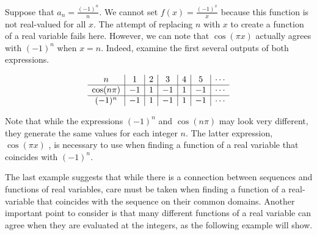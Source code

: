 \documentclass{ximera}
\begin{document}
\begin{example}
Suppose that $a_n = \frac{(-1)^n}{n}$.  We cannot set $f(x) = \frac{(-1)^x}{x}$ because this function is not real-valued for all $x$.  The attempt of replacing $n$ with $x$ to create a function of a real variable fails here.  However, we can note that $\cos(\pi x)$ actually agrees with $(-1)^n$ when $x=n$.  Indeed, examine the first several outputs of both expressions.

\[
\begin{array}{c | c | c| c | c | c | c }
n & 1 & 2 & 3 & 4 & 5 & \cdots \\
\hline 
\cos(n \pi) & -1 & 1 & -1 & 1 & -1 &  \cdots \\
\hline
(-1)^n & -1 & 1 & -1 & 1 & -1 & \cdots
\end{array} 
\]
\end{example}

Note that while the expressions $(-1)^n$ and $\cos(n \pi)$ may look very different, they generate the same values for each integer $n$.  The latter expression, $\cos(\pi x)$ , is necessary to use when finding a function of a real variable that coincides with $(-1)^n$.

The last example suggests that while there is a connection between sequences and functions of real variables, care must be taken when finding a function of a real-variable that coincides with the sequence on their common domains.  Another important point to consider is that many different functions of a real variable can agree when they are evaluated at the integers, as the following example will show.
\end{document}
